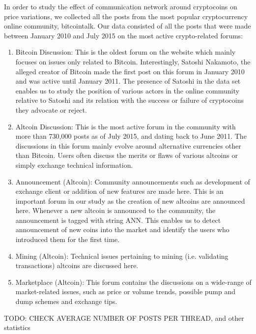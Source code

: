 In order to study the effect of communication network around cryptocoins on
price variations, we collected all the posts from the most popular cryptocurrency
online community, bitcointalk.  Our data consisted of all the posts that were
made between January 2010 and July 2015 on the most active crypto-related forums:
\begin{enumerate}
  \item{Bitcoin Discussion:} This is the oldest forum on the website which mainly focuses
    on issues only related to Bitcoin. Interestingly, Satoshi Nakamoto, the alleged
    creator of Bitcoin made the first post on this forum in January 2010 and
    was active until January 2011. The presence of Satoshi in the data set enables us
    to study the position of various actors in the online community relative to Satoshi
    and its relation with the success or failure of cryptocoins they advocate or reject.

  \item{Altcoin Discussion:} This is the most active forum in the community
    with more than 730,000 posts as of July 2015, and dating back to June 2011.
    The discussions in this forum mainly evolve around alternative currencies
    other than Bitcoin. Users often discuss the merits or flaws of various
    altcoins or simply exchange technical information.
  
  \item{Announcement (Altcoin):} Community announcements such as development of 
    exchange client or addition of new features are made here. This is an important forum
    in our study as the creation of new altcoins are announced here. Whenever a new
    altcoin is announced to the community, the announcement is tagged with string ANN.
    This enables us to detect announcement of new coins into the market and identify
    the users who introduced them for the first time.

  \item{Mining (Altcoin):} Technical issues pertaining to mining (i.e. validating transactions)
    altcoins are discussed here.
  \item{Marketplace (Altcoin):} This forum contains the discussions on a wide-range of 
    market-related issues, such as price or volume trends, possible pump and dump schemes
    and exchange tips.

\end{enumerate}
TODO: CHECK AVERAGE NUMBER OF POSTS PER THREAD, and other statistics

